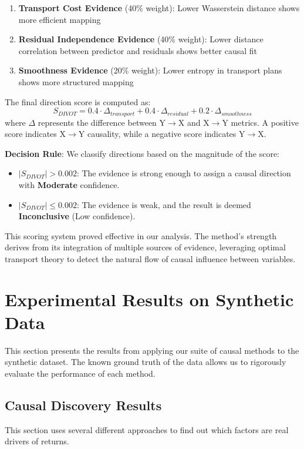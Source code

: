 \begin{enumerate}
    \item \textbf{Transport Cost Evidence} (40\% weight): Lower Wasserstein distance shows more efficient mapping
    \item \textbf{Residual Independence Evidence} (40\% weight): Lower distance correlation between predictor and residuals shows better causal fit  
    \item \textbf{Smoothness Evidence} (20\% weight): Lower entropy in transport plans shows more structured mapping
\end{enumerate}

The final direction score is computed as:
$$S_{DIVOT} = 0.4 \cdot \Delta_{transport} + 0.4 \cdot \Delta_{residual} + 0.2 \cdot \Delta_{smoothness}$$
where $\Delta$ represents the difference between Y$\rightarrow$X and X$\rightarrow$Y metrics. A positive score indicates X$\rightarrow$Y causality, while a negative score indicates Y$\rightarrow$X.

\textbf{Decision Rule}: We classify directions based on the magnitude of the score:
\begin{itemize}
    \item $|S_{DIVOT}| > 0.002$: The evidence is strong enough to assign a causal direction with \textbf{Moderate} confidence.
    \item $|S_{DIVOT}| \leq 0.002$: The evidence is weak, and the result is deemed \textbf{Inconclusive} (Low confidence).
\end{itemize}

This scoring system proved effective in our analysis. The method's strength derives from its integration of multiple sources of evidence, leveraging optimal transport theory to detect the natural flow of causal influence between variables.

\section{Experimental Results on Synthetic Data}
\label{sec:synthetic_results}

This section presents the results from applying our suite of causal methods to the synthetic dataset. The known ground truth of the data allows us to rigorously evaluate the performance of each method.

\subsection{Causal Discovery Results}
This section uses several different approaches to find out which factors are real drivers of returns.

